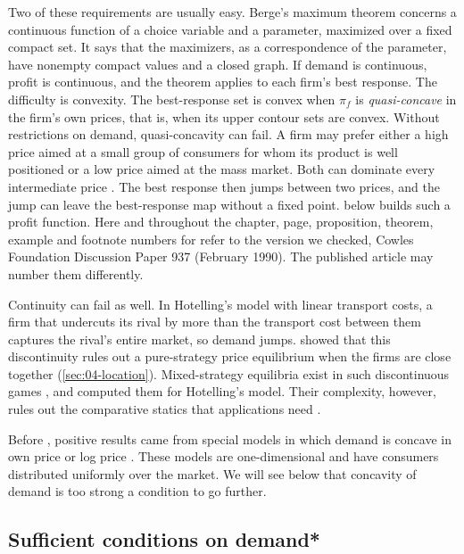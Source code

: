 Two of these requirements are usually easy. Berge's maximum theorem concerns a continuous function of a choice
variable and a parameter, maximized over a fixed compact set. It says that the maximizers, as a correspondence of
the parameter, have nonempty compact values and a closed graph. If demand is continuous, profit is continuous, and
the theorem applies to each firm's best response. The difficulty is convexity. The best-response set
is convex when $\pi_f$ is \emph{quasi-concave} in the firm's own prices, that is, when its upper contour sets
are convex. Without restrictions on demand, quasi-concavity can fail. A firm may prefer either a high price
aimed at a small group of consumers for whom its product is well positioned or a low price aimed at the mass
market. Both can dominate every intermediate price \citep[p.~2]{CaplinNalebuff1991}. The best response then
jumps between two prices, and the jump can leave the best-response map without a fixed point.
 below builds such a profit function. Here and throughout the chapter, page, proposition,
theorem, example and footnote numbers for \citet{CaplinNalebuff1991} refer to the version we checked, Cowles
Foundation Discussion Paper 937 (February 1990). The published article may number them differently.

Continuity can fail as well. In Hotelling's model with linear transport costs, a firm that undercuts its rival
by more than the transport cost between them captures the rival's entire market, so demand jumps.
\citet{DAspremontGabszewiczThisse1979} showed that this discontinuity rules out a pure-strategy price
equilibrium when the firms are close together (\cref{sec:04-location}). Mixed-strategy equilibria exist in
such discontinuous games \citep{DasguptaMaskin1986}, and \citet{OsbornePitchik1987} computed them for
Hotelling's model. Their complexity, however, rules out the comparative statics that applications need
\citep[p.~2]{CaplinNalebuff1991}.

Before \citet{CaplinNalebuff1991}, positive results came from special models in which demand is concave in own
price or log price \citep{GabszewiczThisse1979,ShakedSutton1982,Lane1980,Hauser1988,Economides1989}. These
models are one-dimensional and have consumers distributed uniformly over the market. We will see below that
concavity of demand is too strong a condition to go further.

\subsection{Sufficient conditions on demand*}\label{sec:04-existence-demand}

